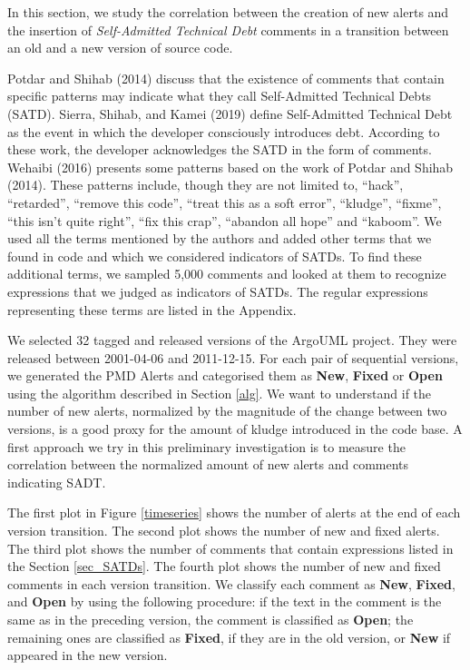 \documentclass[
]{article}
\begin{document}
In this section, we study the correlation between the creation of new
alerts and the insertion of \textit{Self-Admitted Technical Debt}
comments in a transition between an old and a new version of source
code.

%
%

Potdar and Shihab (2014) discuss that the existence of comments that contain specific patterns may indicate what they call Self-Admitted Technical Debts (SATD). Sierra, Shihab, and Kamei (2019) define Self-Admitted Technical Debt as the event in which the developer consciously introduces debt. According to these work, the developer acknowledges the SATD in the form of comments. Wehaibi (2016) presents some patterns based on the work of Potdar and Shihab (2014). These patterns include, though they are not limited to, ``hack'', ``retarded'', ``remove this code'', ``treat this as a soft error'', ``kludge'', ``fixme'', ``this isn't quite right'', ``fix this crap'', ``abandon all hope'' and ``kaboom''. We used all the terms mentioned by the authors and added other terms that we found in code and which we considered indicators of SATDs. To find these additional terms, we sampled 5,000 comments and looked at them to recognize expressions that we judged as indicators of SATDs. The regular expressions representing these terms are listed in the Appendix.

We selected 32 tagged and released versions of the ArgoUML project. They were released between 2001-04-06 and 2011-12-15. For each pair of sequential versions, we generated the PMD Alerts and categorised them as \textbf{New}, \textbf{Fixed} or \textbf{Open} using the algorithm described in Section \ref{alg}. We want to understand if the number of new alerts, normalized by the magnitude of the change between two versions, is a good proxy for the amount of kludge introduced in the code base. A first approach we try in this preliminary investigation is to measure the correlation between the normalized amount of new alerts and comments indicating SADT. %

The first plot in Figure \ref{timeseries} shows the number of alerts at the end of each version transition. The second plot shows the number of new and fixed alerts. The third plot shows the number of comments that contain expressions listed in the Section \ref{sec_SATDs}. The fourth plot shows the number of new and fixed comments in each version transition. We classify each comment as \textbf{New}, \textbf{Fixed}, and \textbf{Open} by using the following procedure: if the text in the comment is the same as in the preceding version, the comment is classified as \textbf{Open}; the remaining ones are classified as \textbf{Fixed}, if they are in the old version, or \textbf{New} if appeared in the new version.
\end{document}
